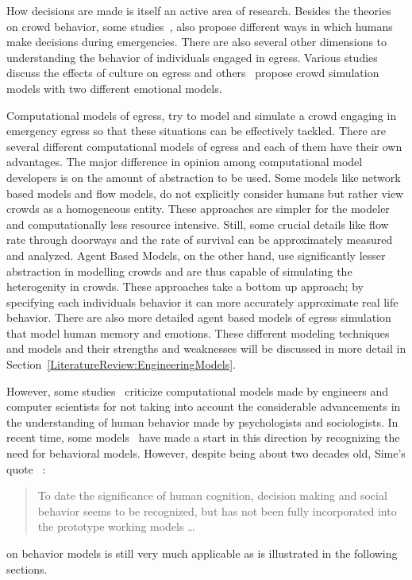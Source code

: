 How decisions are made is itself an active area of research. Besides the theories on crowd behavior, some studies~\cite{Pires:2005gs, Ozel:2001tn}, also propose different ways in which humans make decisions during emergencies. There are also several other dimensions to understanding the behavior of individuals engaged in egress. Various studies~\cite{Andree:2008td,Sandberg:1997tw,Kobes:2009jx} discuss the effects of culture on egress and others~\cite{Pelechano:2005vp,Aydt:2011wz} propose crowd simulation models with two different emotional models.

Computational models of egress, try to model and simulate a crowd engaging in emergency egress so that these situations can be effectively tackled. There are several different computational models of egress and each of them have their own advantages. The major difference in opinion among computational model developers is on the amount of abstraction to be used. Some models like network based models and flow models, do not explicitly consider humans but rather view crowds as a homogeneous entity. These approaches are simpler for the modeler and computationally less resource intensive. Still, some crucial details like flow rate through doorways and the rate of survival can be approximately measured and analyzed. Agent Based Models, on the other hand, use significantly lesser abstraction in modelling crowds and are thus capable of simulating the heterogenity in crowds. These approaches take a bottom up approach; by specifying each individuals behavior it can more accurately approximate real life behavior. There are also more detailed agent based models of egress simulation that model human memory and emotions. These different modeling techniques and models and their strengths and weaknesses will be discussed in more detail in Section~\ref{LiteratureReview:EngineeringModels}.

However, some studies~\cite{Torres:2010tj,Sime:1995uu,Aguirre:2004tn} criticize computational models made by engineers and computer scientists for not taking into account the considerable advancements in the understanding of human behavior made by psychologists and sociologists. In recent time, some models~\cite{Pan:2006vp} have made a start in this direction by recognizing the need for behavioral models. However, despite being about two decades old, Sime's quote~\cite{Sime:1995uu}  :
\begin{quote}
To date the significance of human cognition, decision making and social behavior seems to be recognized, but has not been fully incorporated into the prototype working models \ldots
\end{quote}
on behavior models is still very much applicable as is illustrated in the following sections.

